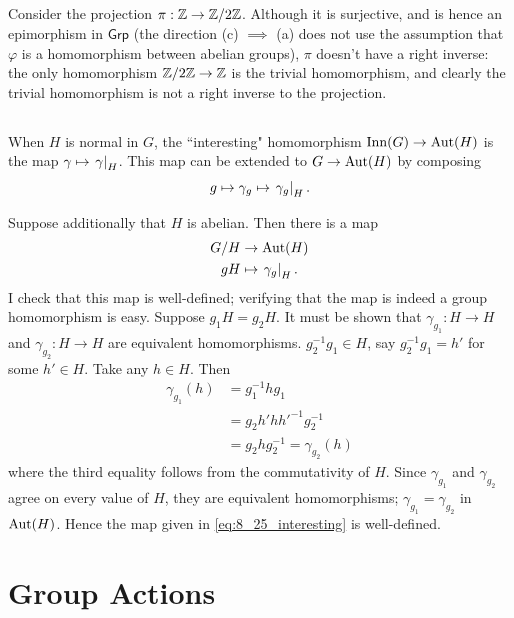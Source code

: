 \documentclass[12pt]{article}
\begin{document}
\setcounter{subsection}{23}
\subsection{} 
Consider the projection $\pi: \mathbb{Z} \rightarrow \mathbb{Z} / 2\mathbb{Z}$. 
Although it is surjective, and is hence an epimorphism in $\mathsf{Grp}$ (the direction (c) $\implies$ (a) does not use the assumption that $\varphi$ is a homomorphism between abelian groups), $\pi$ doesn't have a right inverse: 
the only homomorphism $\mathbb{Z} / 2\mathbb{Z} \rightarrow \mathbb{Z}$ is the trivial homomorphism, and clearly the trivial homomorphism is not a right inverse to the projection. 

\subsection{} 
When $H$ is normal in $G$, the ``interesting" homomorphism $\text{Inn}(G) \rightarrow \text{Aut}(H)$ is the map $\gamma \mapsto \left.\gamma\right|_{H}$. 
This map can be extended to $G \rightarrow \text{Aut}(H)$ by composing 
$$g \mapsto \gamma_{g} \mapsto \left.\gamma_{g}\right|_{H}.$$

Suppose additionally that $H$ is abelian. 
Then there is a map 
\begin{align}
  G/H & \rightarrow \text{Aut}(H) \label {eq:8_25_interesting} \\ 
  gH & \mapsto \left.\gamma_{g}\right|_{H}. \nonumber
\end{align}
I check that this map is well-defined; 
verifying that the map is indeed a group homomorphism is easy. 
Suppose $g_{1} H = g_{2} H$. 
It must be shown that $\gamma_{g_1}: H \rightarrow H$ and $\gamma_{g_2}: H \rightarrow H$ are equivalent homomorphisms. 
$g_{2}^{-1} g_{1} \in H$, say $g_{2}^{-1} g_{1} = h'$ for some $h' \in H$. 
Take any $h \in H$. 
Then 
\begin{align*}
  \gamma_{g_1}(h) & = g_{1}^{-1} h g_{1} \\ 
                  & = g_2 h' h {h'}^{-1} g_{2}^{-1} \\ 
                  & = g_2 h g_{2}^{-1} = \gamma_{g_2}(h)
\end{align*}
where the third equality follows from the commutativity of $H$. 
Since $\gamma_{g_1}$ and $\gamma_{g_2}$ agree on every value of $H$, they are equivalent homomorphisms; 
$\gamma_{g_1} = \gamma_{g_2}$ in $\text{Aut}(H)$. 
Hence the map given in \eqref{eq:8_25_interesting} is well-defined. 

\section{Group Actions}
\newcommand{\cat}{\mathsf{G\text{-}Set}}
\end{document}
